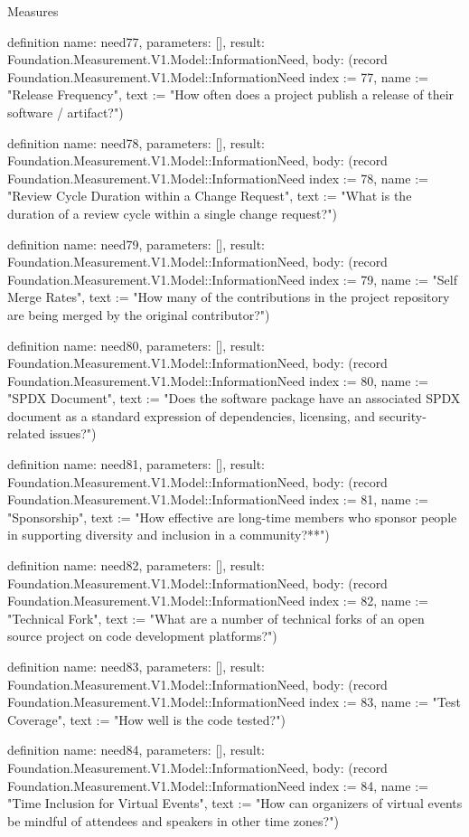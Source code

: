 \begin{lexlean}{Measures}
\begin{semanticmodule}
definition{
  name: need77,
  parameters: [],
  result: Foundation.Measurement.V1.Model::InformationNeed,
  body: (record Foundation.Measurement.V1.Model::InformationNeed {index := 77, name := "Release Frequency", text := "How often does a project publish a release of their software / artifact?"})
}

definition{
  name: need78,
  parameters: [],
  result: Foundation.Measurement.V1.Model::InformationNeed,
  body: (record Foundation.Measurement.V1.Model::InformationNeed {index := 78, name := "Review Cycle Duration within a Change Request", text := "What is the duration of a review cycle within a single change request?"})
}

definition{
  name: need79,
  parameters: [],
  result: Foundation.Measurement.V1.Model::InformationNeed,
  body: (record Foundation.Measurement.V1.Model::InformationNeed {index := 79, name := "Self Merge Rates", text := "How many of the contributions in the project repository are being merged by the original contributor?"})
}

definition{
  name: need80,
  parameters: [],
  result: Foundation.Measurement.V1.Model::InformationNeed,
  body: (record Foundation.Measurement.V1.Model::InformationNeed {index := 80, name := "SPDX Document", text := "Does the software package have an associated SPDX document as a standard expression of dependencies, licensing, and security-related issues?"})
}

definition{
  name: need81,
  parameters: [],
  result: Foundation.Measurement.V1.Model::InformationNeed,
  body: (record Foundation.Measurement.V1.Model::InformationNeed {index := 81, name := "Sponsorship", text := "How effective are long-time members who sponsor people in supporting diversity and inclusion in a community?**"})
}

definition{
  name: need82,
  parameters: [],
  result: Foundation.Measurement.V1.Model::InformationNeed,
  body: (record Foundation.Measurement.V1.Model::InformationNeed {index := 82, name := "Technical Fork", text := "What are a number of technical forks of an open source project on code development platforms?"})
}

definition{
  name: need83,
  parameters: [],
  result: Foundation.Measurement.V1.Model::InformationNeed,
  body: (record Foundation.Measurement.V1.Model::InformationNeed {index := 83, name := "Test Coverage", text := "How well is the code tested?"})
}

definition{
  name: need84,
  parameters: [],
  result: Foundation.Measurement.V1.Model::InformationNeed,
  body: (record Foundation.Measurement.V1.Model::InformationNeed {index := 84, name := "Time Inclusion for Virtual Events", text := "How can organizers of virtual events be mindful of attendees and speakers in other time zones?"})
}


\end{semanticmodule}
\end{lexlean}
